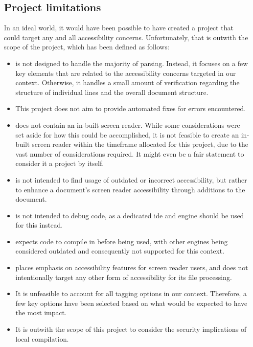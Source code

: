 \subsection{\nmu Project \nmu limitations}\label{conc:project_limits}
In an ideal world, it would have been possible to have created a project that could target any and all \latexspaced accessibility concerns. Unfortunately, that is outwith the scope of the project, which has been defined as follows:
\begin{itemize}
    \item \lintexspaced is not designed to handle the majority of parsing. Instead, it focuses on a few key elements that are related to the accessibility concerns targeted in our context. Otherwise, it handles a small amount of verification regarding the structure of individual lines and the overall document structure.
    \item This project does not aim to provide automated fixes for errors encountered.
    \item \lintexspaced does not contain an in-built screen reader. While some considerations were set aside for how this could be accomplished, it is not feasible to create an in-built screen reader within the timeframe allocated for this project, due to the vast number of considerations required. It might even be a fair statement to consider it a project by itself.
    \item \lintexspaced is not intended to find usage of outdated or incorrect accessibility, but rather to enhance a document's screen reader accessibility through additions to the document.
    \item \lintexspaced is not intended to debug \latexspaced code, as a dedicated \acrfull{ide} and \texspaced engine should be used for this instead.
    \item \lintexspaced expects \latexspaced code to compile in \lualatexspaced before being used, with other \texspaced engines being considered outdated and consequently not supported for this context.
    \item \lintexspaced places emphasis on accessibility features for screen reader users, and does not intentionally target any other form of accessibility for its \latexspaced file processing.
    \item It is unfeasible to account for all \gls{tagging} options in our context. Therefore, a few key options have been selected based on what would be expected to have the most impact.
    \item It is outwith the scope of this project to consider the security implications of local \latexspaced compilation.
\end{itemize}

